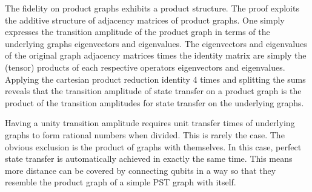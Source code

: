 \noindent The fidelity on product graphs exhibits a product structure. The proof exploits the additive structure of adjacency matrices of product graphs. One simply expresses the transition amplitude of the product graph in terms of the underlying graphs eigenvectors and eigenvalues. The eigenvectors and eigenvalues of the original graph adjacency matrices times the identity matrix are simply the (tensor) products of each respective operators eigenvectors and eigenvalues. Applying the cartesian product reduction identity 4 times and splitting the sums reveals that the transition amplitude of state transfer on a product graph is the product of the transition amplitudes for state transfer on the underlying graphs.\par
Having a unity transition amplitude requires unit transfer times of underlying graphs to form rational numbers when divided. This is rarely the case. The obvious exclusion is the product of graphs with themselves. In this case, perfect state transfer is automatically achieved in exactly the same time. This means more distance can be covered by connecting qubits in a way so that they resemble the product graph of a simple PST graph with itself.

